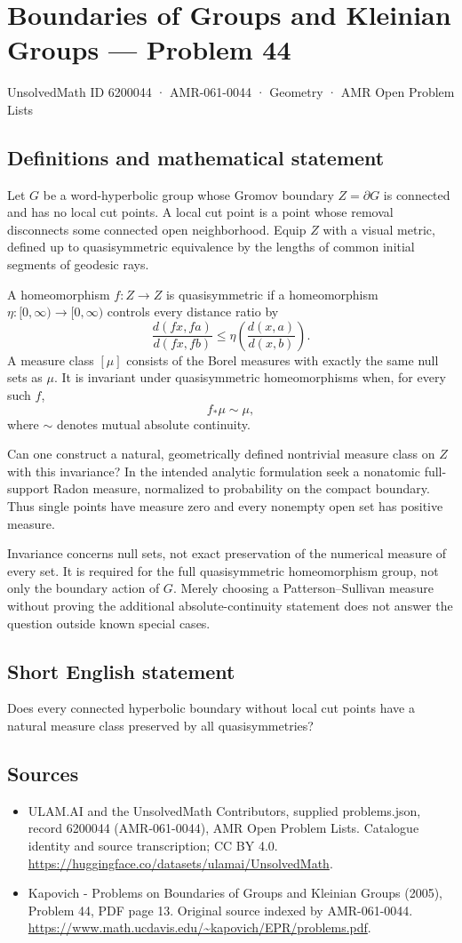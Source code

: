 \documentclass[11pt,a4paper]{article}
\begin{document}
\section*{Boundaries of Groups and Kleinian Groups — Problem 44}\label{6200044}
{\small UnsolvedMath ID 6200044 · AMR-061-0044 · Geometry · AMR Open Problem Lists}
\subsection{Definitions and mathematical statement}
Let $G$ be a word-hyperbolic group whose Gromov boundary $Z=\partial G$ is connected and has no local cut points. A local cut point is a point whose removal disconnects some connected open neighborhood. Equip $Z$ with a visual metric, defined up to quasisymmetric equivalence by the lengths of common initial segments of geodesic rays.

A homeomorphism $f:Z\to Z$ is quasisymmetric if a homeomorphism $\eta:[0,\infty)\to[0,\infty)$ controls every distance ratio by
\[
 \frac{d(fx,fa)}{d(fx,fb)}\leq
                 \eta\!\left(\frac{d(x,a)}{d(x,b)}\right).
\]
A measure class $[\mu]$ consists of the Borel measures with exactly the same null sets as $\mu$. It is invariant under quasisymmetric homeomorphisms when, for every such $f$,
\[
 f_*\mu\sim\mu,
\]
where $\sim$ denotes mutual absolute continuity.

Can one construct a natural, geometrically defined nontrivial measure class on $Z$ with this invariance? In the intended analytic formulation seek a nonatomic full-support Radon measure, normalized to probability on the compact boundary. Thus single points have measure zero and every nonempty open set has positive measure.

Invariance concerns null sets, not exact preservation of the numerical measure of every set. It is required for the full quasisymmetric homeomorphism group, not only the boundary action of $G$. Merely choosing a Patterson--Sullivan measure without proving the additional absolute-continuity statement does not answer the question outside known special cases.
\subsection{Short English statement}
Does every connected hyperbolic boundary without local cut points have a natural measure class preserved by all quasisymmetries?
\subsection{Sources}
\begin{itemize}
\item[S1] ULAM.AI and the UnsolvedMath Contributors, supplied problems.json, record 6200044 (AMR-061-0044), AMR Open Problem Lists. Catalogue identity and source transcription; CC BY 4.0.
\url{https://huggingface.co/datasets/ulamai/UnsolvedMath}.
\item[S2] Kapovich - Problems on Boundaries of Groups and Kleinian Groups (2005), Problem 44, PDF page 13. Original source indexed by AMR-061-0044.
\url{https://www.math.ucdavis.edu/~kapovich/EPR/problems.pdf}.
\end{itemize}
\end{document}
